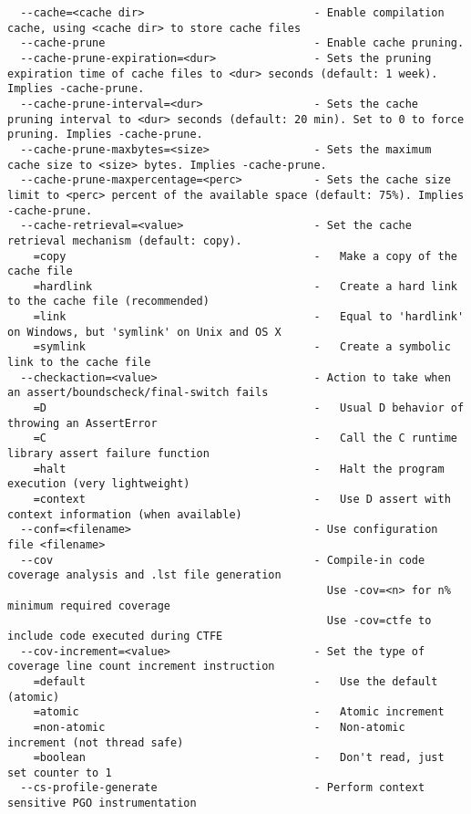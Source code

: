 \documentclass[732]{studrep}
\begin{document}
\begin{verbatim}
  --cache=<cache dir>                          - Enable compilation cache, using <cache dir> to store cache files
  --cache-prune                                - Enable cache pruning.
  --cache-prune-expiration=<dur>               - Sets the pruning expiration time of cache files to <dur> seconds (default: 1 week). Implies -cache-prune.
  --cache-prune-interval=<dur>                 - Sets the cache pruning interval to <dur> seconds (default: 20 min). Set to 0 to force pruning. Implies -cache-prune.
  --cache-prune-maxbytes=<size>                - Sets the maximum cache size to <size> bytes. Implies -cache-prune.
  --cache-prune-maxpercentage=<perc>           - Sets the cache size limit to <perc> percent of the available space (default: 75%). Implies -cache-prune.
  --cache-retrieval=<value>                    - Set the cache retrieval mechanism (default: copy).
    =copy                                      -   Make a copy of the cache file
    =hardlink                                  -   Create a hard link to the cache file (recommended)
    =link                                      -   Equal to 'hardlink' on Windows, but 'symlink' on Unix and OS X
    =symlink                                   -   Create a symbolic link to the cache file
  --checkaction=<value>                        - Action to take when an assert/boundscheck/final-switch fails
    =D                                         -   Usual D behavior of throwing an AssertError
    =C                                         -   Call the C runtime library assert failure function
    =halt                                      -   Halt the program execution (very lightweight)
    =context                                   -   Use D assert with context information (when available)
  --conf=<filename>                            - Use configuration file <filename>
  --cov                                        - Compile-in code coverage analysis and .lst file generation
                                                 Use -cov=<n> for n% minimum required coverage
                                                 Use -cov=ctfe to include code executed during CTFE
  --cov-increment=<value>                      - Set the type of coverage line count increment instruction
    =default                                   -   Use the default (atomic)
    =atomic                                    -   Atomic increment
    =non-atomic                                -   Non-atomic increment (not thread safe)
    =boolean                                   -   Don't read, just set counter to 1
  --cs-profile-generate                        - Perform context sensitive PGO instrumentation

\end{verbatim}
\end{document}

